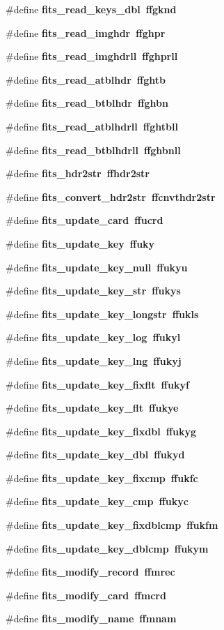 \begin{CompactItemize}
\item 
\#define \bf{fits\_\-read\_\-keys\_\-dbl}~ffgknd
\item 
\#define \bf{fits\_\-read\_\-imghdr}~ffghpr
\item 
\#define \bf{fits\_\-read\_\-imghdrll}~ffghprll
\item 
\#define \bf{fits\_\-read\_\-atblhdr}~ffghtb
\item 
\#define \bf{fits\_\-read\_\-btblhdr}~ffghbn
\item 
\#define \bf{fits\_\-read\_\-atblhdrll}~ffghtbll
\item 
\#define \bf{fits\_\-read\_\-btblhdrll}~ffghbnll
\item 
\#define \bf{fits\_\-hdr2str}~ffhdr2str
\item 
\#define \bf{fits\_\-convert\_\-hdr2str}~ffcnvthdr2str
\item 
\#define \bf{fits\_\-update\_\-card}~ffucrd
\item 
\#define \bf{fits\_\-update\_\-key}~ffuky
\item 
\#define \bf{fits\_\-update\_\-key\_\-null}~ffukyu
\item 
\#define \bf{fits\_\-update\_\-key\_\-str}~ffukys
\item 
\#define \bf{fits\_\-update\_\-key\_\-longstr}~ffukls
\item 
\#define \bf{fits\_\-update\_\-key\_\-log}~ffukyl
\item 
\#define \bf{fits\_\-update\_\-key\_\-lng}~ffukyj
\item 
\#define \bf{fits\_\-update\_\-key\_\-fixflt}~ffukyf
\item 
\#define \bf{fits\_\-update\_\-key\_\-flt}~ffukye
\item 
\#define \bf{fits\_\-update\_\-key\_\-fixdbl}~ffukyg
\item 
\#define \bf{fits\_\-update\_\-key\_\-dbl}~ffukyd
\item 
\#define \bf{fits\_\-update\_\-key\_\-fixcmp}~ffukfc
\item 
\#define \bf{fits\_\-update\_\-key\_\-cmp}~ffukyc
\item 
\#define \bf{fits\_\-update\_\-key\_\-fixdblcmp}~ffukfm
\item 
\#define \bf{fits\_\-update\_\-key\_\-dblcmp}~ffukym
\item 
\#define \bf{fits\_\-modify\_\-record}~ffmrec
\item 
\#define \bf{fits\_\-modify\_\-card}~ffmcrd
\item 
\#define \bf{fits\_\-modify\_\-name}~ffmnam
\item 

\end{CompactItemize}
